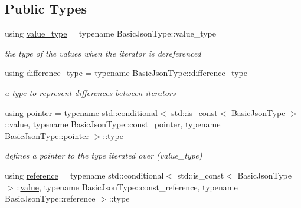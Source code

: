 \subsection*{Public Types}
\begin{DoxyCompactItemize}
\item 
using \hyperlink{classnlohmann_1_1detail_1_1iter__impl_ab35586a44f2222272c5346baa3013f67}{value\+\_\+type} = typename Basic\+Json\+Type\+::value\+\_\+type\hypertarget{classnlohmann_1_1detail_1_1iter__impl_ab35586a44f2222272c5346baa3013f67}{}\label{classnlohmann_1_1detail_1_1iter__impl_ab35586a44f2222272c5346baa3013f67}

\begin{DoxyCompactList}\small\item\em the type of the values when the iterator is dereferenced \end{DoxyCompactList}\item 
using \hyperlink{classnlohmann_1_1detail_1_1iter__impl_a2f7ea9f7022850809c60fc3263775840}{difference\+\_\+type} = typename Basic\+Json\+Type\+::difference\+\_\+type\hypertarget{classnlohmann_1_1detail_1_1iter__impl_a2f7ea9f7022850809c60fc3263775840}{}\label{classnlohmann_1_1detail_1_1iter__impl_a2f7ea9f7022850809c60fc3263775840}

\begin{DoxyCompactList}\small\item\em a type to represent differences between iterators \end{DoxyCompactList}\item 
using \hyperlink{classnlohmann_1_1detail_1_1iter__impl_a69e52f890ce8c556fd68ce109e24b360}{pointer} = typename std\+::conditional$<$ std\+::is\+\_\+const$<$ Basic\+Json\+Type $>$\+::\hyperlink{classnlohmann_1_1detail_1_1iter__impl_adc4048d25e057ce8ec0b912642c24731}{value}, typename Basic\+Json\+Type\+::const\+\_\+pointer, typename Basic\+Json\+Type\+::pointer $>$\+::type\hypertarget{classnlohmann_1_1detail_1_1iter__impl_a69e52f890ce8c556fd68ce109e24b360}{}\label{classnlohmann_1_1detail_1_1iter__impl_a69e52f890ce8c556fd68ce109e24b360}

\begin{DoxyCompactList}\small\item\em defines a pointer to the type iterated over (value\+\_\+type) \end{DoxyCompactList}\item 
using \hyperlink{classnlohmann_1_1detail_1_1iter__impl_a5be8001be099c6b82310f4d387b953ce}{reference} = typename std\+::conditional$<$ std\+::is\+\_\+const$<$ Basic\+Json\+Type $>$\+::\hyperlink{classnlohmann_1_1detail_1_1iter__impl_adc4048d25e057ce8ec0b912642c24731}{value}, typename Basic\+Json\+Type\+::const\+\_\+reference, typename Basic\+Json\+Type\+::reference $>$\+::type\hypertarget{classnlohmann_1_1detail_1_1iter__impl_a5be8001be099c6b82310f4d387b953ce}{}\label{classnlohmann_1_1detail_1_1iter__impl_a5be8001be099c6b82310f4d387b953ce}


\end{DoxyCompactItemize}
